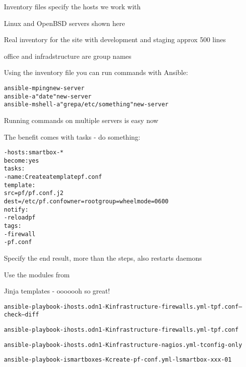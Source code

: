 \documentclass[18pt,landscape,a4paper,footrule]{foils}
\begin{document}
\begin{list2}
\item Inventory files specify the hosts we work with
\item Linux and OpenBSD servers shown here
\item Real inventory for the site with development and staging approx 500 lines
\item office and infradstructure are group names
\end{list2}



Using the inventory file you can run commands with Ansible:

\begin{alltt}\footnotesize
  ansible -m ping new-server
  ansible -a "date" new-server
  ansible -m shell -a "grep a /etc/something" new-server
\end{alltt}

\begin{list2}
\item Running commands on multiple servers is easy now
\end{list2}



The benefit comes with tasks - do something:

\begin{alltt}\footnotesize
  - hosts: smartbox-*
    become: yes
    tasks:
    - name: Create a template pf.conf
      template:
        src=pf/pf.conf.j2
        dest=/etc/pf.conf owner=root group=wheel mode=0600
     notify:
        - reload pf
      tags:
        - firewall
        - pf.conf
\end{alltt}

\begin{list2}
\item Specify the end result, more than the steps, also restarts daemons
\item Use the modules from\\
\item Jinja templates - ooooooh so great!
\end{list2}


\begin{alltt}\footnotesize
ansible-playbook -i hosts.odn1 -K infrastructure-firewalls.yml -t pf.conf --check --diff

ansible-playbook -i hosts.odn1 -K infrastructure-firewalls.yml -t pf.conf

ansible-playbook -i hosts.odn1 -K infrastructure-nagios.yml -t config-only

ansible-playbook -i smartboxes -K create-pf-conf.yml -l smartbox-xxx-01
\end{alltt}
\end{document}
